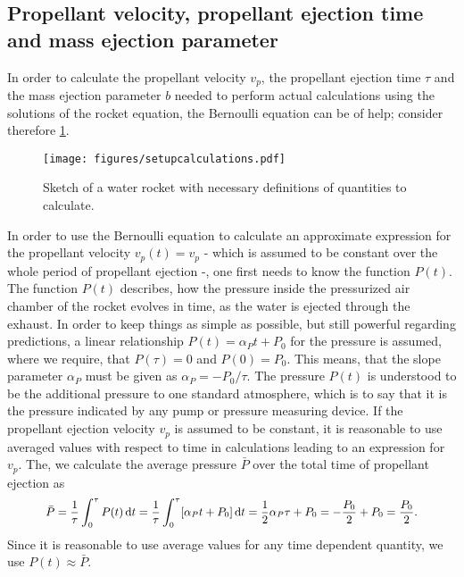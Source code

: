 \documentclass[a4paper,11pt]{report}
\begin{document}
\subsection{Propellant velocity, propellant ejection time and mass ejection parameter}
In order to calculate the propellant velocity $v_p$, the propellant ejection time $\tau$ and the mass ejection parameter $b$ needed to perform actual calculations using the solutions of the rocket equation, the Bernoulli equation can be of help; consider therefore \cref{fig:setupcalculations}.
\begin{figure}[h!]
\centering
\texttt{[image: figures/setupcalculations.pdf]}
\caption{Sketch of a water rocket with necessary definitions of quantities to calculate.}
\label{fig:setupcalculations}
\end{figure}

In order to use the Bernoulli equation to calculate an approximate expression for the propellant velocity $v_p(t) = v_p$ - which is assumed to be constant over the whole period of propellant ejection -, one first needs to know the function $P(t)$. The function $P(t)$ describes, how the pressure inside the pressurized air chamber of the rocket evolves in time, as the water is ejected through the exhaust. In order to keep things as simple as possible, but still powerful regarding predictions, a linear relationship $P(t) = \alpha_P t + P_0$ for the pressure is assumed, where we require, that $P(\tau) = 0$ and $P(0) = P_0$. This means, that the slope parameter $\alpha_P$ must be given as $\alpha_P = -P_0/\tau$. The pressure $P(t)$ is understood to be the additional pressure to one standard atmosphere, which is to say that it is the pressure indicated by any pump or pressure measuring device. If the propellant ejection velocity $v_p$ is assumed to be constant, it is reasonable to use averaged values with respect to time in calculations leading to an expression for $v_p$. The, we calculate the average pressure $\bar{P}$ over the total time of propellant ejection as \begin{align}\small\begin{aligned}
\bar{P} = \frac{1}{\tau}\int_{0}^{\tau} P(t)\,\mathrm{d}t = \frac{1}{\tau}\int_{0}^{\tau} [\alpha_P t + P_0]\,\mathrm{d}t = \frac{1}{2}\alpha_P\tau + P_0 = -\frac{P_0}{2} + P_0 = \frac{P_0}{2}.
\end{aligned}\end{align} Since it is reasonable to use average values for any time dependent quantity, we use $P(t) \approx \bar{P}$.
\end{document}

